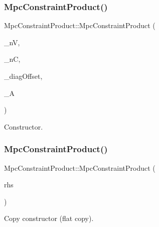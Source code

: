 \subsubsection{\texorpdfstring{Mpc\+Constraint\+Product()}{MpcConstraintProduct()}\hspace{0.1cm}{\footnotesize\ttfamily [2/6]}}
{\footnotesize\ttfamily Mpc\+Constraint\+Product\+::\+Mpc\+Constraint\+Product (\begin{DoxyParamCaption}\item[{\hyperlink{_types_8hpp_ab6fd6105e64ed14a0c9281326f05e623}{int\+\_\+t}}]{\+\_\+nV,  }\item[{\hyperlink{_types_8hpp_ab6fd6105e64ed14a0c9281326f05e623}{int\+\_\+t}}]{\+\_\+nC,  }\item[{\hyperlink{_types_8hpp_ab6fd6105e64ed14a0c9281326f05e623}{int\+\_\+t}}]{\+\_\+diag\+Offset,  }\item[{\hyperlink{qp_o_a_s_e_s__wrapper_8h_a0d00e2b3dfadee81331bbb39068570c4}{real\+\_\+t} $\ast$}]{\+\_\+A }\end{DoxyParamCaption})\hspace{0.3cm}{\ttfamily [inline]}}

Constructor. \mbox{\label{class_mpc_constraint_product_a8aa8f5b5c8945ef44399fa26f532883a}} 
\subsubsection{\texorpdfstring{Mpc\+Constraint\+Product()}{MpcConstraintProduct()}\hspace{0.1cm}{\footnotesize\ttfamily [3/6]}}
{\footnotesize\ttfamily Mpc\+Constraint\+Product\+::\+Mpc\+Constraint\+Product (\begin{DoxyParamCaption}\item[{const \hyperlink{class_mpc_constraint_product}{Mpc\+Constraint\+Product} \&}]{rhs }\end{DoxyParamCaption})\hspace{0.3cm}{\ttfamily [inline]}}

Copy constructor (flat copy). \mbox{\label{class_mpc_constraint_product_a39284cc529040c7d08638753206fc215}} 
